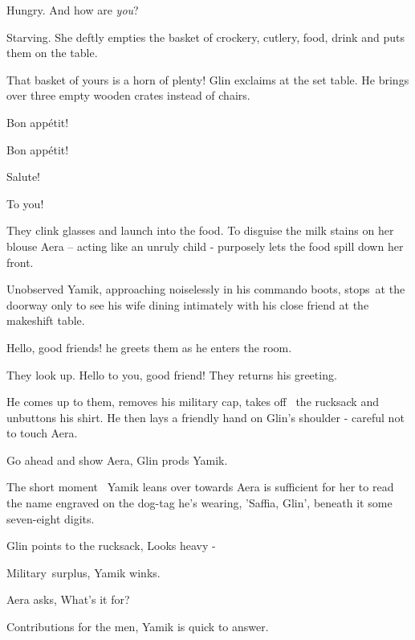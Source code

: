 \documentclass[letterpaper]{article}
\begin{document}
{\textquotedbl}Hungry. And how are \textit{you}?{\textquotedbl} 

{\textquotedbl}Starving.{\textquotedbl} She deftly empties the basket of crockery, cutlery, food, drink and puts them on
the table. 

{\textquotedbl}That basket of yours is a horn of plenty!{\textquotedbl} Glin exclaims at the set table. He brings over
three empty wooden crates instead of chairs. 

{\textquotedbl}Bon app\'etit!{\textquotedbl} 

{\textquotedbl}Bon app\'etit!{\textquotedbl} 

{\textquotedbl}Salute!{\textquotedbl} 

{\textquotedbl}To you!{\textquotedbl} 

They clink glasses and launch into the food. To disguise the milk stains on her blouse Aera -- acting like an unruly
child - purposely lets the food spill down her front.

Unobserved Yamik, approaching noiselessly in his commando boots, stops~at the doorway only to see his wife dining
intimately with his close friend at the makeshift table. 

{\textquotedbl}Hello, good friends!{\textquotedbl} he greets them as he enters the room. ~

They look up. {\textquotedbl}Hello to you,\textcolor{red}{ }good\textcolor{red}{ }friend!{\textquotedbl} They returns
his greeting.

He comes up to them, removes\textcolor[rgb]{0.0,0.4392157,0.7529412}{ }his military cap, takes off \ the rucksack and
unbuttons his shirt. He then lays a friendly hand on Glin's shoulder - careful not to touch Aera.

{\textquotedbl}Go ahead and show Aera,{\textquotedbl} Glin prods Yamik. 

The short moment \ Yamik leans over towards Aera is sufficient for her to read the name engraved on the
dog\textcolor[rgb]{0.0,0.4392157,0.7529412}{{}-}tag he's wearing, 'Saffia, Glin', beneath it some seven-eight digits. 

Glin points to the rucksack, {\textquotedbl}Looks heavy -{\textquotedbl}~ 

{\textquotedbl}Military~surplus,{\textquotedbl} Yamik winks. 

Aera asks, {\textquotedbl}What's it for?{\textquotedbl} 

{\textquotedbl}Contributions for the men,{\textquotedbl} Yamik is quick to answer. 
\end{document}
